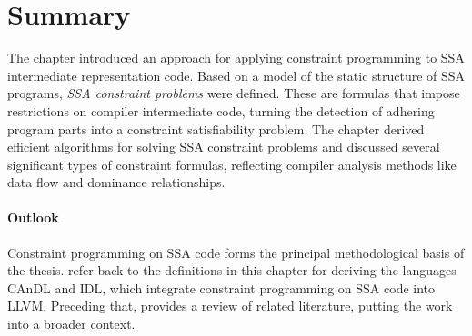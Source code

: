 \section{Summary}

    The chapter introduced an approach for applying constraint programming to
    SSA intermediate representation code.
    Based on a model of the static structure of SSA programs,
    {\it SSA constraint problems} were defined.
    These are formulas that impose restrictions on compiler intermediate code,
    turning the detection of adhering program parts into a constraint
    satisfiability problem.
    The chapter derived efficient algorithms for solving SSA constraint problems
    and discussed several significant types of constraint formulas, reflecting
    compiler analysis methods like data flow and dominance relationships.

    \paragraph*{Outlook}
    Constraint programming on SSA code forms the principal methodological basis
    of the thesis.
     refer back to the definitions in
    this chapter for deriving the languages CAnDL and IDL, which integrate
    constraint programming on SSA code into LLVM.
    Preceding that,  provides a review of related
    literature, putting the work into a broader context. 


    